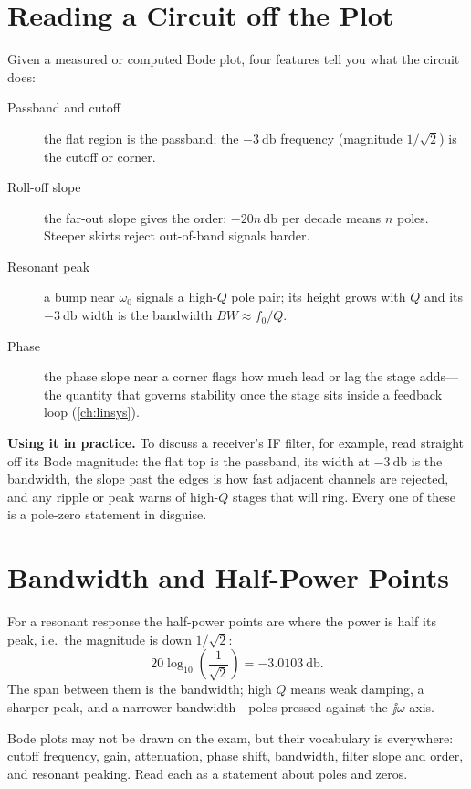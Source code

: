 \section{Reading a Circuit off the Plot}
Given a measured or computed Bode plot, four features tell you what the circuit
does:
\begin{description}
\item[Passband and cutoff] the flat region is the passband; the
\(-\SI{3}{\decibel}\) frequency (magnitude \(1/\sqrt2\)) is the cutoff or corner.
\item[Roll-off slope] the far-out slope gives the order: \(-20n\,\si{\decibel}\)
per decade means \(n\) poles. Steeper skirts reject out-of-band signals harder.
\item[Resonant peak] a bump near \(\omega_0\) signals a high-\(Q\) pole pair; its
height grows with \(Q\) and its \(-\SI{3}{\decibel}\) width is the bandwidth
\(BW\approx f_0/Q\).
\item[Phase] the phase slope near a corner flags how much lead or lag the stage
adds---the quantity that governs stability once the stage sits inside a feedback
loop (\cref{ch:linsys}).
\end{description}

\begin{physicalbox}
\textbf{Using it in practice.} To discuss a receiver's IF filter, for example,
read straight off its Bode magnitude: the flat top is the passband, its width at
\(-\SI{3}{\decibel}\) is the bandwidth, the slope past the edges is how fast
adjacent channels are rejected, and any ripple or peak warns of high-\(Q\) stages
that will ring. Every one of these is a pole-zero statement in disguise.
\end{physicalbox}

\section{Bandwidth and Half-Power Points}
For a resonant response the half-power points are where the power is half its
peak, i.e.\ the magnitude is down \(1/\sqrt2\):
\[
20\log_{10}\!\left(\frac{1}{\sqrt2}\right)=-\SI{3.0103}{\decibel}.
\]
The span between them is the bandwidth; high \(Q\) means weak damping, a sharper
peak, and a narrower bandwidth---poles pressed against the \(\jj\omega\) axis.

\begin{exambox}
Bode plots may not be drawn on the exam, but their vocabulary is everywhere:
cutoff frequency, gain, attenuation, phase shift, bandwidth, filter slope and
order, and resonant peaking. Read each as a statement about poles and zeros.
\end{exambox}

